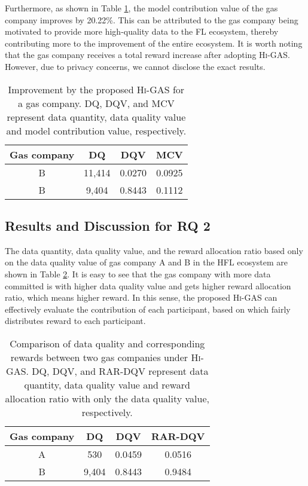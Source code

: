 \documentclass{article}
\newcommand{\methodname}{\textsc{Hi-GAS}}
\begin{document}
Furthermore, as shown in Table \ref{tab:improvement}, the model contribution value of the gas company improves by 20.22\%. This can be attributed to the gas company being motivated to provide more high-quality data to the FL ecosystem, thereby contributing more to the improvement of the entire ecosystem. It is worth noting that the gas company receives a total reward increase after adopting \methodname{}. However, due to privacy concerns, we cannot disclose the exact results.
\begin{table}[t!]
\centering
\caption{Improvement by the proposed \methodname{} for a gas company. DQ, DQV, and MCV represent data quantity, data quality value and model contribution value, respectively.}
\begin{tabular}{|*{4}{c|}}
\hline
Gas company    & DQ & DQV & MCV \\\hline
B  & 11,414  &  0.0270 & 0.0925 \\\hline
B  & 9,404 &  0.8443 & 0.1112 \\\hline
\end{tabular}
\label{tab:improvement}
\end{table}

\subsection{Results and Discussion for RQ 2}
The data quantity, data quality value, and the reward allocation ratio based only on the data quality value of gas company A and B in the HFL ecosystem are shown in Table \ref{tab:data_quality_reward}. It is easy to see that the gas company with more data committed is with higher data quality value and gets higher reward allocation ratio, which means higher reward. In this sense, the proposed \methodname{} can effectively evaluate the contribution of each participant, based on which fairly distributes reward to each participant. 

\begin{table}[t!]
\centering
\caption{Comparison of data quality and corresponding rewards between two gas companies under \methodname{}. DQ, DQV, and RAR-DQV represent data quantity, data quality value and reward allocation ratio with only the data quality value, respectively.}
\begin{tabular}{|*{4}{c|}}
\hline
Gas company   & DQ & DQV & RAR-DQV \\\hline
A  & 530  &  0.0459 & 0.0516 \\\hline
B  & 9,404 &  0.8443 & 0.9484\\\hline
\end{tabular}
\label{tab:data_quality_reward}
\end{table}
\end{document}
